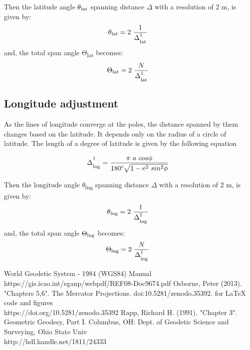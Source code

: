 \documentclass[conference]{IEEEtran}
\begin{document}
Then the latitude angle $\theta\textsubscript{lat}$ spanning distance $\Delta$ with a resolution of 2 m, is given by:
\begin{equation}\theta\textsubscript{lat} = 2 \ \frac{1}{\Delta^\textsuperscript{1}_\textsubscript{lat}}\end{equation}
and, the total span angle $\Theta$\textsubscript{lat} becomes:
\begin{equation}\Theta\textsubscript{lat} = 2 \ \frac{N}{\Delta^\textsuperscript{1}_\textsubscript{lat}}\end{equation}

\subsection{Longitude adjustment}
As the lines of longitude converge at the poles, the distance spanned by them changes based on the latitude. It depends only on the radius of a circle of latitude. The length of a degree of latitude is given by the following equation\cite{b3}

\begin{equation}\Delta^\textsuperscript{1}_\textsubscript{lng}=\frac{\pi \ a \ cos\phi} {180\degree \sqrt{1-e\textsuperscript{2} \ sin\textsuperscript{2}\phi}}\end{equation}

Then the longitude angle $\theta$\textsubscript{lng} spanning distance $\Delta$ with a resolution of 2 m, is given by:
\begin{equation}\theta\textsubscript{lng} = 2 \ \frac{1}{\Delta^\textsuperscript{1}_\textsubscript{lng}}\end{equation}
and, the total span angle $\Theta\textsubscript{lng}$ becomes:
\begin{equation}\Theta\textsubscript{lng} = 2 \ \frac{N}{\Delta^\textsuperscript{1}_\textsubscript{lng}}\end{equation}

\begin{thebibliography}{1}
  World Geodetic System - 1984 (WGS84) Manual\\
https://gis.icao.int/eganp/webpdf/REF08-Doc9674.pdf
 Osborne, Peter (2013). "Chapters 5,6". The Mercator Projections. doi:10.5281/zenodo.35392. for LaTeX code and figures \\
https://doi.org/10.5281/zenodo.35392
 Rapp, Richard H. (1991). "Chapter 3". Geometric Geodesy, Part I. Columbus, OH: Dept. of Geodetic Science and Surveying, Ohio State Univ \\
http://hdl.handle.net/1811/24333
\end{thebibliography}
\end{document}
